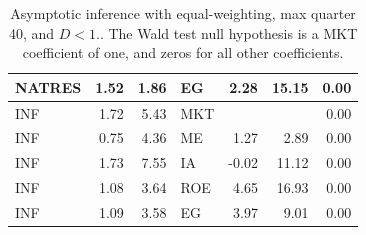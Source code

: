 \documentclass[12pt]{article}
\begin{document}
\begin{table}[ht]
\begin{tabular}{lrrlrrr}
		NATRES & 1.52 & 1.86 & EG & 2.28 & 15.15 & 0.00 \\ 
		\hline
		INF & 1.72 & 5.43 & MKT &  &  & 0.00 \\ 
		INF & 0.75 & 4.36 & ME & 1.27 & 2.89 & 0.00 \\ 
		INF & 1.73 & 7.55 & IA & -0.02 & 11.12 & 0.00 \\ 
		INF & 1.08 & 3.64 & ROE & 4.65 & 16.93 & 0.00 \\ 
		INF & 1.09 & 3.58 & EG & 3.97 & 9.01 & 0.00 \\ 
		\hline
		\hline
	\end{tabular}
	\caption{Asymptotic inference with equal-weighting, max quarter 40, and $D<1$.. The Wald test null hypothesis is a MKT coefficient of one, and zeros for all other coefficients.}
	\label{tab:ai_40_ew_indep}
\end{table}
\end{document}
